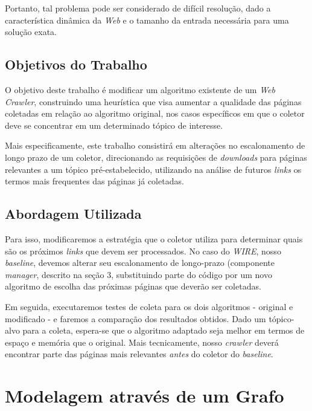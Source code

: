\documentclass[a4paper,12pt,titlepage]{article}
\begin{document}
Portanto, tal problema pode ser considerado de difícil resolução, dado a característica dinâmica da \textit{Web} e o tamanho da entrada necessária para uma solução exata.

\subsection{Objetivos do Trabalho}

O objetivo deste trabalho é modificar um algoritmo existente de um \textit{Web Crawler}, construindo uma heurística que visa aumentar a qualidade das páginas coletadas em relação ao algoritmo original, nos casos específicos em que o coletor deve se concentrar em um determinado tópico de interesse.

Mais especificamente, este trabalho consistirá em alterações no escalonamento de longo prazo de um coletor, direcionando as requisições de \textit{downloads} para páginas relevantes a um tópico pré-estabelecido, utilizando na análise de futuros \textit{links} os termos mais frequentes das páginas já coletadas.


\subsection{Abordagem Utilizada}

Para isso, modificaremos a estratégia que o coletor utiliza para determinar quais são os próximos \textit{links} que devem ser processados. No caso do \textit{WIRE}, nosso \textit{baseline}, devemos alterar seu escalonamento de longo-prazo (componente \textit{manager}, descrito na seção 3, substituindo parte do código por um novo algoritmo de escolha das próximas páginas que deverão ser coletadas.

Em seguida, executaremos testes de coleta para os dois algoritmos - original e modificado - e faremos a comparação dos resultados obtidos. Dado um tópico-alvo para a coleta, espera-se que o algoritmo adaptado seja melhor em termos de espaço e memória que o original. Mais tecnicamente, nosso \textit{crawler} deverá encontrar parte das páginas mais relevantes \textit{antes} do coletor do \textit{baseline}. 

\section{Modelagem através de um Grafo}
\end{document}
